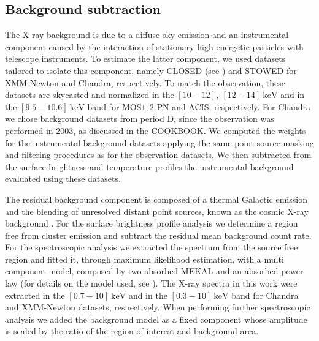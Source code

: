 \documentclass[twocolumn,traditabstract]{aa}
\begin{document}
\subsection{Background subtraction}
The X-ray background is due to a diffuse sky emission and an instrumental component caused by the interaction of stationary high energetic particles with telescope instruments. To estimate the latter component, we used datasets tailored to isolate this component, namely CLOSED (see \citealt{pratt2009}) and STOWED for XMM-Newton and Chandra, respectively. To match the observation, these datasets are skycasted and normalized in the $[10-12], \ [12-14] \ \si{\kilo\electronvolt}$ and in the $[9.5-10.6] \ \si{\kilo\electronvolt}$ band for MOS$1,2$-PN and ACIS, respectively. For Chandra we chose background datasets from period D, since the observation was performed in 2003, as discussed in the COOKBOOK. We computed the weights for the instrumental background datasets applying the same point source masking and filtering procedures as for the observation datasets. We then subtracted from the surface brightness and temperature profiles the instrumental background evaluated using these datasets.

The residual background component is composed of a thermal Galactic emission \citep{snowden1995} and the blending of unresolved distant point sources, known as the cosmic X-ray background \citep{giacconi2001}. For the surface brightness profile analysis we determine a region free from cluster emission and subtract the residual mean background count rate. For the spectroscopic analysis we extracted the spectrum from the source free region and fitted it, through maximum likelihood estimation, with a multi component model, composed by two absorbed MEKAL and an absorbed power law (for details on the model used, see \citealt{pratt2009}). The X-ray spectra in this work were extracted in the $[0.7-10] \ \si{\kilo\electronvolt}$ and in the $[0.3-10] \ \si{\kilo\electronvolt}$ band for Chandra and XMM-Newton datasets, respectively. When performing further spectroscopic analysis we added the background model as a fixed component whose amplitude is scaled by the ratio of the region of interest and background area.

\end{document}
